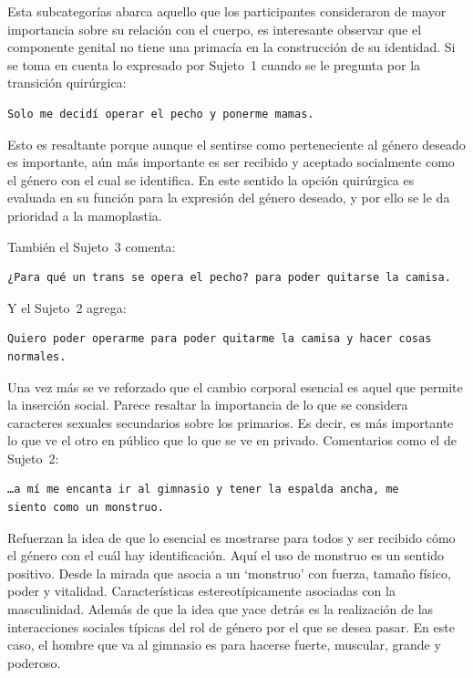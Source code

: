 Esta subcategorías abarca aquello que los participantes consideraron de mayor
importancia sobre su relación con el cuerpo, es interesante observar que el
componente genital no tiene una primacía en la construcción de su identidad. Si
se toma en cuenta lo expresado por Sujeto~1 cuando se le pregunta por la
transición quirúrgica:

\begin{verbatim}
Solo me decidí operar el pecho y ponerme mamas.
\end{verbatim}

Esto es resaltante porque aunque el sentirse como perteneciente al género
deseado es importante, aún más importante es ser recibido y aceptado socialmente
como el género con el cual se identifica. En este sentido la opción quirúrgica
es evaluada en su función para la expresión del género deseado, y por ello se le
da prioridad a la mamoplastia.

También el Sujeto~3 comenta:

\begin{verbatim}
¿Para qué un trans se opera el pecho? para poder quitarse la camisa.
\end{verbatim}

Y el Sujeto~2 agrega:

\begin{verbatim}
Quiero poder operarme para poder quitarme la camisa y hacer cosas normales.
\end{verbatim}

Una vez más se ve reforzado que el cambio corporal esencial es aquel que permite
la inserción social. Parece resaltar la importancia de lo que se considera
caracteres sexuales secundarios sobre los primarios. Es decir, es más importante
lo que ve el otro en público que lo que se ve en privado. Comentarios como el de
Sujeto~2:

\begin{verbatim}
…a mí me encanta ir al gimnasio y tener la espalda ancha, me
siento como un monstruo.
\end{verbatim}

Refuerzan la idea de que lo esencial es mostrarse para todos y ser recibido cómo
el género con el cuál hay identificación. Aquí el uso de monstruo es un sentido
positivo. Desde la mirada que asocia a un ‘monstruo’ con fuerza, tamaño físico,
poder y vitalidad. Características estereotípicamente asociadas con la
masculinidad. Además de que la idea que yace detrás es la realización de las
interacciones sociales típicas del rol de género por el que se desea pasar. En
este caso, el hombre que va al gimnasio es para hacerse fuerte, muscular, grande
y poderoso.


